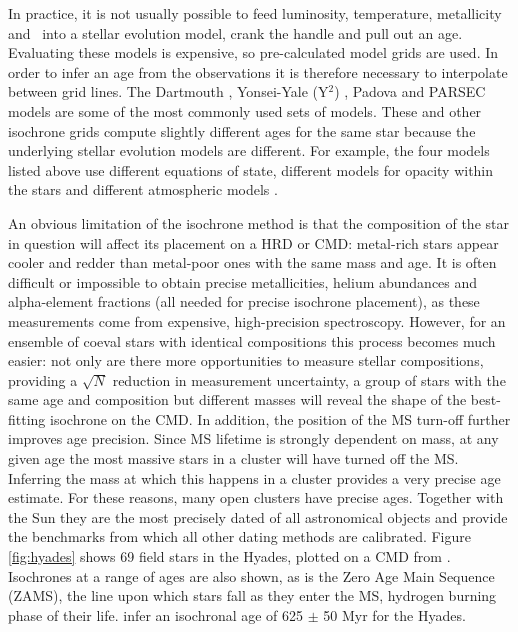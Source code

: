 In practice, it is not usually possible to feed luminosity, temperature,
metallicity and \logg\ into a stellar evolution model, crank the handle and
pull out an age.
Evaluating these models is expensive, so pre-calculated model grids are used.
In order to infer an age from the observations it is therefore necessary to
interpolate between grid lines.
The Dartmouth \citep{Dotter2008}, Yonsei-Yale (Y$^2$) \citep{Yi2001,
Spada2013}, Padova \citep{Giradi2002} and PARSEC \citep{Bressan2012} models
are some of the most commonly used sets of models.
These and other isochrone grids compute slightly different ages for the same
star because the underlying stellar evolution models are different.
For example, the four models listed above use different equations of state,
different models for opacity within the stars and different atmospheric
models \citep[see][for a comparison of these four sets of
isochrones]{Thompson2014}.

An obvious limitation of the isochrone method is that the composition of the
star in question will affect its placement on a HRD or CMD: metal-rich stars
appear cooler and redder than metal-poor ones with the same mass and age.
It is often difficult or impossible to obtain precise metallicities, helium
abundances and alpha-element fractions (all needed for precise isochrone
placement), as these measurements come from expensive, high-precision
spectroscopy.
However, for an ensemble of coeval stars with identical compositions this
process becomes much easier: not only are there more opportunities to measure
stellar compositions, providing a $\sqrt N$ reduction in measurement
uncertainty, a group of stars with the same age and composition but different
masses will reveal the shape of the best-fitting isochrone on the CMD\@.
In addition, the position of the MS turn-off further improves age precision.
Since MS lifetime is strongly dependent on mass, at any given age the most
massive stars in a cluster will have turned off the MS.
Inferring the mass at which this happens in a cluster provides a very precise
age estimate.
For these reasons, many open clusters have precise ages.
Together with the Sun they are the most precisely dated of all astronomical
objects and provide the benchmarks from which all other dating methods are
calibrated.
Figure \ref{fig:hyades} shows 69 field stars in the Hyades, plotted on a CMD
from \citep{Perryman1998}.
Isochrones at a range of ages are also shown, as is the Zero Age Main Sequence
(ZAMS), the line upon which stars fall as they enter the MS, hydrogen burning
phase of their life.
\citet{Perryman1998} infer an isochronal age of 625 $\pm$ 50 Myr for the
Hyades.

